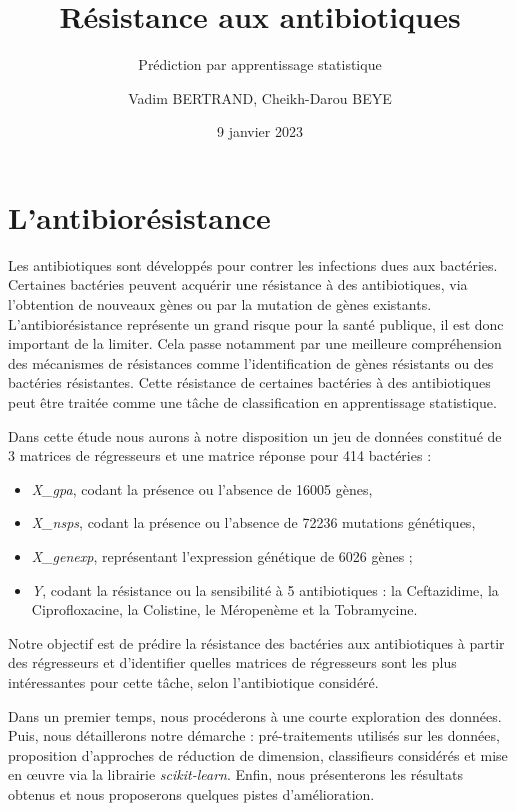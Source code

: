 \documentclass[11pt]{article}
\title{Résistance aux antibiotiques}
\subtitle{Prédiction par apprentissage statistique}
\author{Vadim BERTRAND, Cheikh-Darou BEYE}
\date{9 janvier 2023}
\begin{document}
\maketitle

\renewcommand*\contentsname{Sommaire}{
  \hypersetup{linkcolor=}
  \setcounter{tocdepth}{3}
  \tableofcontents
}
\newpage

\hypertarget{antibioresistance}{%
\section{L'antibiorésistance}\label{antibioresistance}}

  Les antibiotiques sont développés pour contrer les infections dues aux bactéries.
  Certaines bactéries peuvent acquérir une résistance à des antibiotiques, via l'obtention de nouveaux gènes ou par la mutation de gènes existants.
  L'antibiorésistance représente un grand risque pour la santé publique, il est donc important de la limiter.
  Cela passe notamment par une meilleure compréhension des mécanismes de résistances comme l'identification de gènes résistants ou des bactéries résistantes.
  Cette résistance de certaines bactéries à des antibiotiques peut être traitée comme une tâche de classification en apprentissage statistique.

  Dans cette étude nous aurons à notre disposition un jeu de données constitué de 3 matrices de régresseurs et une matrice réponse pour 414 bactéries :
  \begin{itemize}
    \item \textit{X\_gpa}, codant la présence ou l'absence de 16005 gènes,
    \item \textit{X\_nsps}, codant la présence ou l'absence de 72236 mutations génétiques,
    \item \textit{X\_genexp}, représentant l'expression génétique de 6026 gènes ;
    \item \textit{Y}, codant la résistance ou la sensibilité à 5 antibiotiques : la Ceftazidime, la Ciprofloxacine, la Colistine, le Méropenème et la Tobramycine.
  \end{itemize}
  Notre objectif est de prédire la résistance des bactéries aux antibiotiques à partir des régresseurs et d'identifier quelles matrices de régresseurs sont les plus intéressantes pour cette tâche, selon l'antibiotique considéré.

  Dans un premier temps, nous procéderons à une courte exploration des données.
  Puis, nous détaillerons notre démarche : pré-traitements utilisés sur les données, proposition d'approches de réduction de dimension, classifieurs considérés et mise en œuvre via la librairie \textit{scikit-learn}.
  Enfin, nous présenterons les résultats obtenus et nous proposerons quelques pistes d'amélioration.
\end{document}
